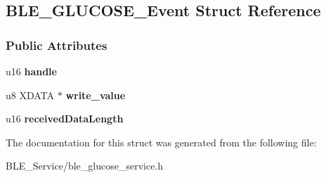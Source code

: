 \hypertarget{struct_b_l_e___g_l_u_c_o_s_e___event}{}\subsection{B\+L\+E\+\_\+\+G\+L\+U\+C\+O\+S\+E\+\_\+\+Event Struct Reference}
\label{struct_b_l_e___g_l_u_c_o_s_e___event}
\subsubsection*{Public Attributes}
\begin{DoxyCompactItemize}
\item 
u16 {\bfseries handle}\hypertarget{struct_b_l_e___g_l_u_c_o_s_e___event_a0e2df5e29c0430e191ce11a0de5e7fd2}{}\label{struct_b_l_e___g_l_u_c_o_s_e___event_a0e2df5e29c0430e191ce11a0de5e7fd2}

\item 
u8 X\+D\+A\+TA $\ast$ {\bfseries write\+\_\+value}\hypertarget{struct_b_l_e___g_l_u_c_o_s_e___event_a0722d3c38638b73fdcf56ee1c11a7853}{}\label{struct_b_l_e___g_l_u_c_o_s_e___event_a0722d3c38638b73fdcf56ee1c11a7853}

\item 
u16 {\bfseries received\+Data\+Length}\hypertarget{struct_b_l_e___g_l_u_c_o_s_e___event_ad043051fb4ca8669e140369585bcc0af}{}\label{struct_b_l_e___g_l_u_c_o_s_e___event_ad043051fb4ca8669e140369585bcc0af}

\end{DoxyCompactItemize}


The documentation for this struct was generated from the following file\+:\begin{DoxyCompactItemize}
\item 
B\+L\+E\+\_\+\+Service/ble\+\_\+glucose\+\_\+service.\+h\end{DoxyCompactItemize}
